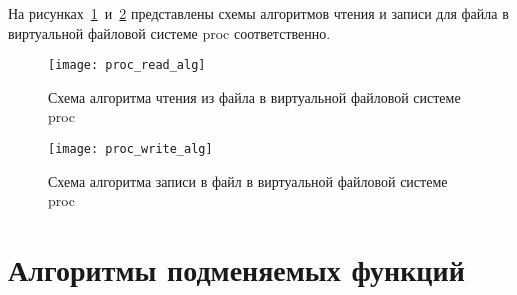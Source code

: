 На рисунках~\ref{proc_read_alg}~и~\ref{proc_write_alg} представлены схемы алгоритмов чтения и записи для файла в виртуальной файловой системе proc соответственно.
\begin{figure}[H]
	\centering
	\texttt{[image: proc\_read\_alg]}
	\caption{Схема алгоритма чтения из файла в виртуальной файловой системе proc}
	\label{proc_read_alg}
\end{figure}
\begin{figure}[H]
	\centering
	\texttt{[image: proc\_write\_alg]}
	\caption{Схема алгоритма записи в файл в виртуальной файловой системе proc}
	\label{proc_write_alg}
\end{figure}

\section{Алгоритмы подменяемых функций}

